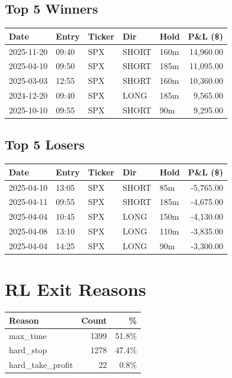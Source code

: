 \documentclass[11pt,a4paper,twoside]{article}
\begin{document}
\subsection{Top 5 Winners}
\noindent\begin{center}
\begin{tabular}{>{\color{txtmain}}l llll r}
\toprule
\rowcolor{cardbg}
\textbf{Date} & \textbf{Entry} & \textbf{Ticker} & \textbf{Dir} & \textbf{Hold} & \textbf{P\&L (\$)} \\
\midrule
2025-11-20 & 09:40 & SPX & SHORT & 160m & \textcolor{wingreen}{14,960.00} \\
2025-04-10 & 09:50 & SPX & SHORT & 185m & \textcolor{wingreen}{11,095.00} \\
2025-03-03 & 12:55 & SPX & SHORT & 160m & \textcolor{wingreen}{10,360.00} \\
2024-12-20 & 09:40 & SPX & LONG & 185m & \textcolor{wingreen}{9,565.00} \\
2025-10-10 & 09:55 & SPX & SHORT & 90m & \textcolor{wingreen}{9,295.00} \\
\bottomrule
\end{tabular}
\end{center}
\subsection{Top 5 Losers}
\noindent\begin{center}
\begin{tabular}{>{\color{txtmain}}l llll r}
\toprule
\rowcolor{cardbg}
\textbf{Date} & \textbf{Entry} & \textbf{Ticker} & \textbf{Dir} & \textbf{Hold} & \textbf{P\&L (\$)} \\
\midrule
2025-04-10 & 13:05 & SPX & SHORT & 85m & \textcolor{lossred}{-5,765.00} \\
2025-04-11 & 09:55 & SPX & SHORT & 185m & \textcolor{lossred}{-4,675.00} \\
2025-04-04 & 10:45 & SPX & LONG & 150m & \textcolor{lossred}{-4,130.00} \\
2025-04-08 & 13:10 & SPX & LONG & 110m & \textcolor{lossred}{-3,835.00} \\
2025-04-04 & 14:25 & SPX & LONG & 90m & \textcolor{lossred}{-3,300.00} \\
\bottomrule
\end{tabular}
\end{center}
\clearpage
\section{RL Exit Reasons}
\noindent\begin{center}
\begin{tabular}{>{\color{txtmain}}l rr}
\toprule
\rowcolor{cardbg}
\textbf{Reason} & \textbf{Count} & \textbf{\%} \\
\midrule
max\_time & 1399 & 51.8\% \\
hard\_stop & 1278 & 47.4\% \\
hard\_take\_profit & 22 & 0.8\% \\
\bottomrule
\end{tabular}
\end{center}
\end{document}

